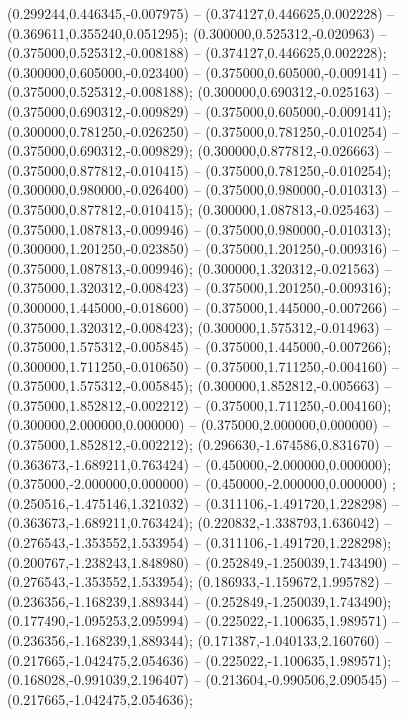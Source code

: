  (0.299244,0.446345,-0.007975) -- (0.374127,0.446625,0.002228) -- (0.369611,0.355240,0.051295);
 (0.300000,0.525312,-0.020963) -- (0.375000,0.525312,-0.008188) -- (0.374127,0.446625,0.002228);
 (0.300000,0.605000,-0.023400) -- (0.375000,0.605000,-0.009141) -- (0.375000,0.525312,-0.008188);
 (0.300000,0.690312,-0.025163) -- (0.375000,0.690312,-0.009829) -- (0.375000,0.605000,-0.009141);
 (0.300000,0.781250,-0.026250) -- (0.375000,0.781250,-0.010254) -- (0.375000,0.690312,-0.009829);
 (0.300000,0.877812,-0.026663) -- (0.375000,0.877812,-0.010415) -- (0.375000,0.781250,-0.010254);
 (0.300000,0.980000,-0.026400) -- (0.375000,0.980000,-0.010313) -- (0.375000,0.877812,-0.010415);
 (0.300000,1.087813,-0.025463) -- (0.375000,1.087813,-0.009946) -- (0.375000,0.980000,-0.010313);
 (0.300000,1.201250,-0.023850) -- (0.375000,1.201250,-0.009316) -- (0.375000,1.087813,-0.009946);
 (0.300000,1.320312,-0.021563) -- (0.375000,1.320312,-0.008423) -- (0.375000,1.201250,-0.009316);
 (0.300000,1.445000,-0.018600) -- (0.375000,1.445000,-0.007266) -- (0.375000,1.320312,-0.008423);
 (0.300000,1.575312,-0.014963) -- (0.375000,1.575312,-0.005845) -- (0.375000,1.445000,-0.007266);
 (0.300000,1.711250,-0.010650) -- (0.375000,1.711250,-0.004160) -- (0.375000,1.575312,-0.005845);
 (0.300000,1.852812,-0.005663) -- (0.375000,1.852812,-0.002212) -- (0.375000,1.711250,-0.004160);
 (0.300000,2.000000,0.000000) -- (0.375000,2.000000,0.000000) -- (0.375000,1.852812,-0.002212);
 (0.296630,-1.674586,0.831670) -- (0.363673,-1.689211,0.763424) -- (0.450000,-2.000000,0.000000);
 (0.375000,-2.000000,0.000000) -- (0.450000,-2.000000,0.000000) ;
 (0.250516,-1.475146,1.321032) -- (0.311106,-1.491720,1.228298) -- (0.363673,-1.689211,0.763424);
 (0.220832,-1.338793,1.636042) -- (0.276543,-1.353552,1.533954) -- (0.311106,-1.491720,1.228298);
 (0.200767,-1.238243,1.848980) -- (0.252849,-1.250039,1.743490) -- (0.276543,-1.353552,1.533954);
 (0.186933,-1.159672,1.995782) -- (0.236356,-1.168239,1.889344) -- (0.252849,-1.250039,1.743490);
 (0.177490,-1.095253,2.095994) -- (0.225022,-1.100635,1.989571) -- (0.236356,-1.168239,1.889344);
 (0.171387,-1.040133,2.160760) -- (0.217665,-1.042475,2.054636) -- (0.225022,-1.100635,1.989571);
 (0.168028,-0.991039,2.196407) -- (0.213604,-0.990506,2.090545) -- (0.217665,-1.042475,2.054636);

